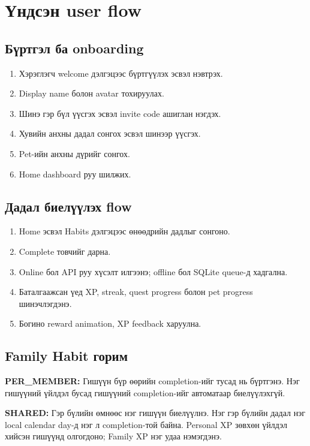\documentclass[12pt,a4paper,oneside]{report}
\begin{document}
\chapter{Үндсэн user flow}

\section{Бүртгэл ба onboarding}
\begin{enumerate}
  \item Хэрэглэгч welcome дэлгэцээс бүртгүүлэх эсвэл нэвтрэх.
  \item Display name болон avatar тохируулах.
  \item Шинэ гэр бүл үүсгэх эсвэл invite code ашиглан нэгдэх.
  \item Хувийн анхны дадал сонгох эсвэл шинээр үүсгэх.
  \item Pet-ийн анхны дүрийг сонгох.
  \item Home dashboard руу шилжих.
\end{enumerate}

\section{Дадал биелүүлэх flow}
\begin{enumerate}
  \item Home эсвэл Habits дэлгэцээс өнөөдрийн дадлыг сонгоно.
  \item Complete товчийг дарна.
  \item Online бол API руу хүсэлт илгээнэ; offline бол SQLite queue-д хадгална.
  \item Баталгаажсан үед XP, streak, quest progress болон pet progress шинэчлэгдэнэ.
  \item Богино reward animation, XP feedback харуулна.
\end{enumerate}

\section{Family Habit горим}
\textbf{PER\_MEMBER:} Гишүүн бүр өөрийн completion-ийг тусад нь бүртгэнэ. Нэг гишүүний үйлдэл бусад гишүүний completion-ийг автоматаар биелүүлэхгүй.

\textbf{SHARED:} Гэр бүлийн өмнөөс нэг гишүүн биелүүлнэ. Нэг гэр бүлийн дадал нэг local calendar day-д нэг л completion-той байна. Personal XP зөвхөн үйлдэл хийсэн гишүүнд олгогдоно; Family XP нэг удаа нэмэгдэнэ.
\end{document}
